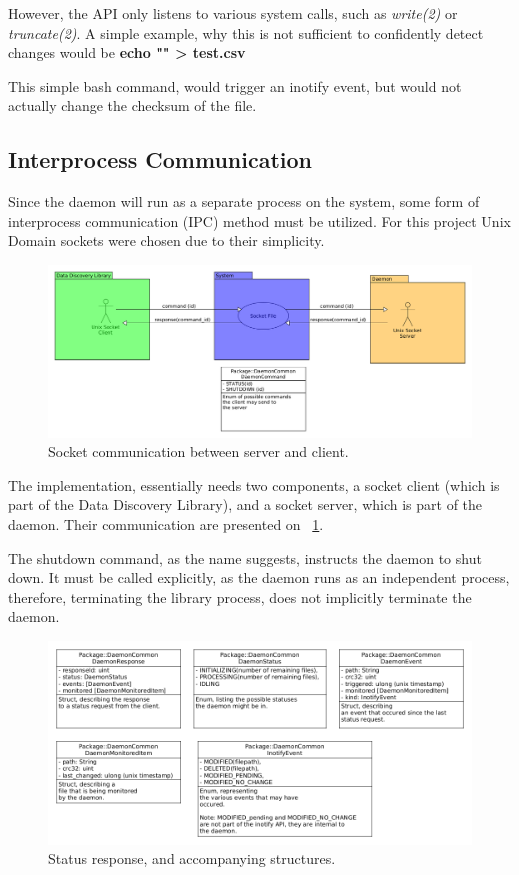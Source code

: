 However, the API only listens to various system calls, such as \textit{write(2)} or \textit{truncate(2)}.
A simple example, why this is not sufficient to confidently detect changes would be \textbf{echo "" > test.csv}

This simple bash command, would trigger an inotify event, but would not actually change the checksum of the file.

\subsection{Interprocess Communication}
Since the daemon will run as a separate process on the system, some form of interprocess communication (IPC) method
must be utilized.
For this project Unix Domain sockets were chosen due to their simplicity.

\begin{figure}[h]
    \centering
    \includegraphics[width=12cm]{figures/daemon/socket_communication}
    \caption{Socket communication between server and client.}
    \label{fig:daemon_fig_1}
\end{figure}


The implementation, essentially needs two components, a socket client (which is part of the Data Discovery Library),
and a socket server, which is part of the daemon. Their communication are presented on ~\ref{fig:daemon_fig_1}.

The shutdown command, as the name suggests, instructs the daemon to shut down.
It must be called explicitly, as the daemon runs as an independent process, therefore,
terminating the library process, does not implicitly terminate the daemon.

\begin{figure}[h]
    \centering
    \includegraphics[width=12cm]{figures/daemon/daemon_response}
    \caption{Status response, and accompanying structures.}
    \label{fig:daemon_fig_2}
\end{figure}


